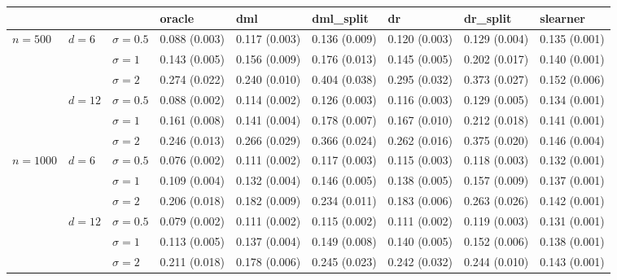 \documentclass[11pt]{article} %
\theoremstyle{theorem}  %
\theoremstyle{plain}
\begin{document}
\begin{figure}[H]
\scriptsize
\centering
\begin{tabular}{lllllllll}
\toprule
         &        &            &         oracle &            dml &     dml\_split &             dr &      dr\_split &       slearner \\
\midrule
\multirow{6}{*}{$n=500$} & \multirow{3}{*}{$d=6$} & $\sigma=0.5$ &  0.088 (0.003) &  0.117 (0.003) &  0.136 (0.009) &  0.120 (0.003) &  0.129 (0.004) &  0.135 (0.001) \\
         &        & $\sigma=1$ &  0.143 (0.005) &  0.156 (0.009) &  0.176 (0.013) &  0.145 (0.005) &  0.202 (0.017) &  0.140 (0.001) \\
         &        & $\sigma=2$ &  0.274 (0.022) &  0.240 (0.010) &  0.404 (0.038) &  0.295 (0.032) &  0.373 (0.027) &  0.152 (0.006) \\
\cline{2-9}
         & \multirow{3}{*}{$d=12$} & $\sigma=0.5$ &  0.088 (0.002) &  0.114 (0.002) &  0.126 (0.003) &  0.116 (0.003) &  0.129 (0.005) &  0.134 (0.001) \\
         &        & $\sigma=1$ &  0.161 (0.008) &  0.141 (0.004) &  0.178 (0.007) &  0.167 (0.010) &  0.212 (0.018) &  0.141 (0.001) \\
         &        & $\sigma=2$ &  0.246 (0.013) &  0.266 (0.029) &  0.366 (0.024) &  0.262 (0.016) &  0.375 (0.020) &  0.146 (0.004) \\
\cline{1-9}
\cline{2-9}
\multirow{6}{*}{$n=1000$} & \multirow{3}{*}{$d=6$} & $\sigma=0.5$ &  0.076 (0.002) &  0.111 (0.002) &  0.117 (0.003) &  0.115 (0.003) &  0.118 (0.003) &  0.132 (0.001) \\
         &        & $\sigma=1$ &  0.109 (0.004) &  0.132 (0.004) &  0.146 (0.005) &  0.138 (0.005) &  0.157 (0.009) &  0.137 (0.001) \\
         &        & $\sigma=2$ &  0.206 (0.018) &  0.182 (0.009) &  0.234 (0.011) &  0.183 (0.006) &  0.263 (0.026) &  0.142 (0.001) \\
\cline{2-9}
         & \multirow{3}{*}{$d=12$} & $\sigma=0.5$ &  0.079 (0.002) &  0.111 (0.002) &  0.115 (0.002) &  0.111 (0.002) &  0.119 (0.003) &  0.131 (0.001) \\
         &        & $\sigma=1$ &  0.113 (0.005) &  0.137 (0.004) &  0.149 (0.008) &  0.140 (0.005) &  0.152 (0.006) &  0.138 (0.001) \\
         &        & $\sigma=2$ &  0.211 (0.018) &  0.178 (0.006) &  0.245 (0.023) &  0.242 (0.032) &  0.244 (0.010) &  0.143 (0.001) \\

\end{tabular}
\end{figure}
\end{document}

